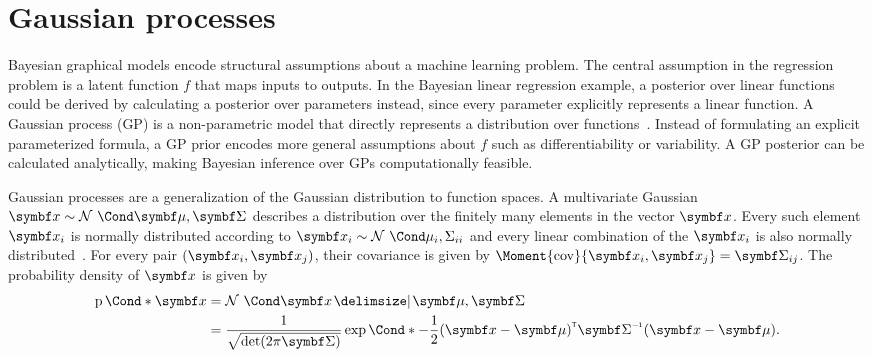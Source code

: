 \section{Gaussian processes}
Bayesian graphical models encode structural assumptions about a machine learning problem.
The central assumption in the regression problem is a latent function $f$ that maps inputs to outputs.
In the Bayesian linear regression example, a posterior over linear functions could be derived by calculating a posterior over parameters instead, since every parameter explicitly represents a linear function.
A Gaussian process (GP) is a non-parametric model that directly represents a distribution over functions~\parencite{bernardo_regression_1998,rasmussen_gaussian_2006}.
Instead of formulating an explicit parameterized formula, a GP prior encodes more general assumptions about $f$ such as differentiability or variability.
A GP posterior can be calculated analytically, making Bayesian inference over GPs computationally feasible.

Gaussian processes are a generalization of the Gaussian distribution to function spaces.
A multivariate Gaussian $\mat{x} \sim \Gaussian{\mat{\mu}, \mat{\Sigma}}$ describes a distribution over the finitely many elements in the vector $\mat{x}$.
Every such element $\rv{x}_i$ is normally distributed according to $\rv{x}_i \sim \Gaussian{\mu_i, \Sigma_{ii}}$ and every linear combination of the $\mat{x}_i$ is also normally distributed~\parencite{astrom_introduction_1971}.
For every pair $(\rv{x}_i, \rv{x}_j)$, their covariance is given by $\Moment{\cov}{\rv{x}_i, \rv{x}_j} = \mat{\Sigma}_{ij}$.
The probability density of $\mat{x}$ is given by
\begin{equation}
    \begin{split}
        \label{eq:gaussian_pdf}
        \Prob*{\mat{x}}
        &= \Gaussian{\mat{x} \given \mat{\mu}, \mat{\Sigma}} \\
        &= \frac{1}{\sqrt{\det(2\pi\mat{\Sigma})}}\Fun*{\exp}{-\frac{1}{2}(\mat{x} - \mat{\mu})\tran \mat{\Sigma}\inv (\mat{x} - \mat{\mu})}.
    \end{split}
\end{equation}

